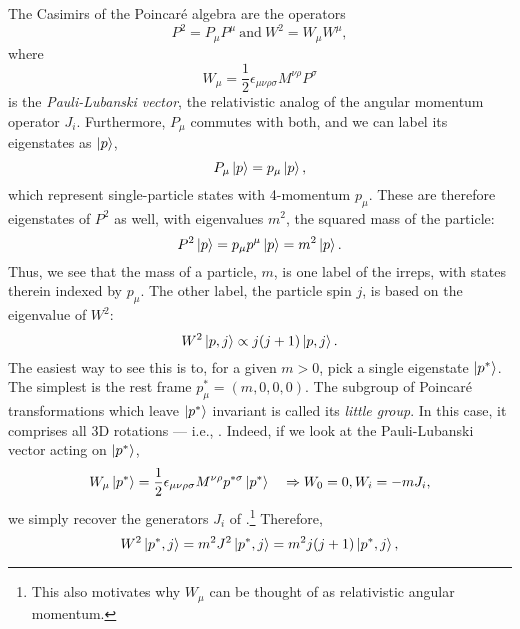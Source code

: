 The Casimirs of the Poincaré algebra are the operators
\begin{equation}
	\label{eq:01_poincare_casimirs}
	P^2 = P_\mu P^\mu\ \mathrm{ and }\ W^2 = W_\mu W^\mu,
\end{equation}
where
\begin{equation}
	\label{eq:01_poincare_wmu}
	W_\mu = \frac{1}{2}\epsilon_{\mu\nu\rho\sigma}M^{\nu\rho}P^\sigma
\end{equation}
is the \textit{Pauli-Lubanski vector}, the relativistic analog of the angular momentum operator $J_i$.
Furthermore, $P_\mu$ commutes with both, and we can label its eigenstates as $\ket{p}$,
\begin{equation}
	\label{eq:01_poincare_pmu_eigenstates}
	P_\mu\ket{p} = p_\mu\ket{p},
\end{equation}
which represent single-particle states with 4-momentum $p_\mu$.
These are therefore eigenstates of $P^2$ as well, with eigenvalues $m^2$, the squared mass of the particle:
\begin{equation}
	\label{eq:01_poincare_p2}
	P^2\ket{p} = p_\mu p^\mu\ket{p} = m^2 \ket{p}.
\end{equation}
Thus, we see that the mass of a particle, $m$, is one label of the irreps, with states therein indexed by $p_\mu$.
The other label, the particle spin $j$, is based on the eigenvalue of $W^2$:
\begin{equation}
	\label{eq:01_poincare_w2}
	W^2\ket{p, j} \propto j(j+1)\ket{p, j}.
\end{equation}
The easiest way to see this is to, for a given $m > 0$, pick a single eigenstate $\ket{p^*}$.
The simplest is the rest frame $p^*_\mu = (m, 0, 0, 0)$.
The subgroup of Poincaré transformations which leave $\ket{p^*}$ invariant is called its \textit{little group}.
In this case, it comprises all 3D rotations --- i.e., \SO[3].
Indeed, if we look at the Pauli-Lubanski vector acting on $\ket{p^*}$,
\begin{equation}
	\label{eq:01_poincare_w2_eigenstates}
	W_\mu\ket{p^*} = \frac{1}{2}\epsilon_{\mu\nu\rho\sigma}M^{\nu\rho}p^{*\sigma}\ket{p^*} \quad\Rightarrow W_0 = 0, W_i = -m J_i,
\end{equation}
we simply recover the generators $J_i$ of \so[3].\footnote{This also motivates why $W_\mu$ can be thought of as relativistic angular momentum.}
Therefore,
\begin{equation}
	\label{eq:01_poincare_w2_eigenvalues}
	W^2\ket{p^*, j} = m^2 J^2 \ket{p^*, j} = m^2j(j+1)\ket{p^*, j},
\end{equation}

